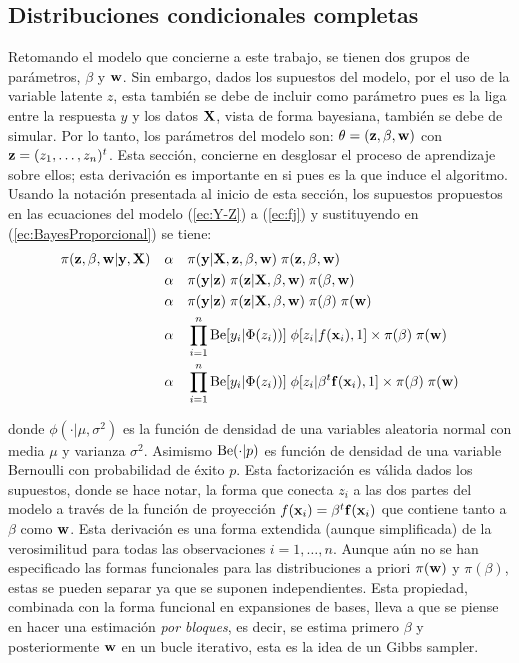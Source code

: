 \documentclass[../Main/Main.tex]{subfiles}
\begin{document}
\subsection{Distribuciones condicionales completas}
Retomando el modelo que concierne a este trabajo, se tienen dos grupos de parámetros, $\beta$ y $\mathbf{w}$. Sin embargo, dados los supuestos del modelo, por el uso de la variable latente $z$, esta también se debe de incluir como parámetro pues es la liga entre la respuesta $y$ y los datos $\mathbf{X}$, vista de forma bayesiana, también se debe de simular. Por lo tanto, los parámetros del modelo son: $\theta = (\mathbf{z}, \beta, \mathbf{w})$ con $\mathbf{z} = (z_1,\ldots,z_n)^t$. Esta sección, concierne en desglosar el proceso de aprendizaje sobre ellos; esta derivación es importante en si pues es la que induce el algoritmo. Usando la notación presentada al inicio de esta sección, los supuestos propuestos en las ecuaciones del modelo (\ref{ec:Y-Z}) a (\ref{ec:fj}) y sustituyendo en (\ref{ec:BayesProporcional}) se tiene:
\begin{align} 
	\pi(\mathbf{z}, \beta , \mathbf{w} | \mathbf{y}, \mathbf{X}) \quad 
	& \alpha \quad \pi(\mathbf{y} | \mathbf{X}, \mathbf{z}, \beta, \mathbf{w}) 
		\; \pi(\mathbf{z}, \beta, \mathbf{w}) \nonumber\\
	& \alpha \quad \pi(\mathbf{y} |\mathbf{z}) \; \pi(\mathbf{z}|\mathbf{X},\beta,\mathbf{w}) 				\; \pi(\beta,\mathbf{w}) \nonumber\\  
	& \alpha \quad \pi(\mathbf{y} |\mathbf{z}) \; \pi(\mathbf{z}|\mathbf{X},\beta,\mathbf{w}) 				\; \pi(\beta) \; \pi(\mathbf{w}) \nonumber\\ 
	& \alpha \quad \prod_{i = 1}^n\text{Be}[y_i | \Phi(z_i))] 
	\; \phi[z_i | f(\mathbf{x}_i), 1] \times  \pi(\beta) \; \pi(\mathbf{w}) \nonumber\\ 
	& \alpha \quad \prod_{i = 1}^n\text{Be}[y_i | \Phi(z_i))] 
	\; \phi[z_i | \beta^t\mathbf{f}(\mathbf{x}_i), 1] \times  \pi(\beta) \; \pi(\mathbf{w}) \label{ec:BayesMod}
\end{align}

donde $\phi(\cdot|\mu, \sigma^2)$ es la función de densidad de una variables aleatoria normal con media $\mu$ y varianza $\sigma^2$. Asimismo $\text{Be}(\cdot|p)$ es función de densidad de una variable Bernoulli con probabilidad de éxito $p$. Esta factorización es válida dados los supuestos, donde se hace notar, la forma que conecta $z_i$ a las dos partes del modelo a través de la función de proyección $f(\mathbf{x}_i) = \beta^t\mathbf{f}(\mathbf{x}_i)$ que contiene tanto a $\beta$ como $\mathbf{w}$. Esta derivación es una forma extendida (aunque simplificada) de la verosimilitud para todas las observaciones $i = 1,\ldots,n$. Aunque aún no se han especificado las formas funcionales para las distribuciones a priori $\pi(\mathbf{w})$ y $\pi(\beta)$, estas se pueden separar ya que se suponen independientes.  Esta propiedad, combinada con la forma funcional en expansiones de bases, lleva a que se piense en hacer una estimación \textit{por bloques}, es decir, se estima primero $\beta$ y posteriormente $\mathbf{w}$ en un bucle iterativo, esta es la idea de un Gibbs sampler. 
\end{document}
